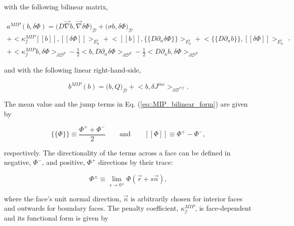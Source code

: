 \documentclass[preprint,10pt]{elsarticle}
\begin{document}
\noindent with the following bilinear matrix,

\begin{equation}
\label{eq::MIP_bilinear_form}
\begin{aligned}
a^{MIP}(b, \delta \Phi)  = \Big(  D \vec{\nabla} b , \vec{\nabla} \delta \Phi  \Big)_{\mathcal{D}} + \Big(  \sigma b , \delta \Phi  \Big)_{\mathcal{D}}    \\
+  \Big< \kappa_f^{MIP} [\![   b ]\!] , [\![  \delta \Phi ]\!]\Big>_{E_h^i} + \Big<  [\![  b ]\!] , \{\!\{  D \partial_n \delta \Phi \}\!\}\Big>_{E_h^i}  + \Big< \{\!\{  D \partial_n b \}\!\} , [\![ \delta \Phi ]\!]\Big>_{E_h^i} \\
+ \Big< \kappa_f^{MIP}  b , \delta  \Phi \Big>_{\partial \mathcal{D}^d} - \frac{1}{2} \Big<  b ,  D \partial_n \delta \Phi \Big>_{\partial \mathcal{D}^d} - \frac{1}{2} \Big<   D \partial_n b , \delta \Phi \Big>_{\partial \mathcal{D}^d}  
\end{aligned} ,
\end{equation}

\noindent and with the following linear right-hand-side,

\begin{equation}
\label{eq::MIP_linear_form}
b^{MIP} (b) = \Big(  b, Q  \Big)_{\mathcal{D}}  + \Big< b, \delta  J^{inc}  \Big>_{\partial \mathcal{D}^{ref}} .
\end{equation}

\noindent  The mean value and the jump terms in Eq. (\ref{eq::MIP_bilinear_form}) are given by

\begin{equation}
\label{eq::solution_mean_and_jump}
\{\!\{  \Phi \}\!\} \equiv \frac{\Phi^+ + \Phi^-}{2} \qquad \text{and} \qquad [\![   \Phi ]\!] \equiv \Phi^+ - \Phi^- ,
\end{equation}

\noindent respectively. The directionality of the terms across a face can be defined in negative, $\Phi^-$, and positive, $\Phi^+$ directions by their trace:

\begin{equation}
\label{eq::solution_trace}
\Phi^{\pm} \equiv \lim_{s \rightarrow 0^{\pm}} \Phi (\vec{r} + s \vec{n}),
\end{equation}

\noindent where the face's unit normal direction, $\vec{n}$ is arbitrarily chosen for interior faces and outwards for boundary faces. The penalty coefficient, $\kappa_f^{MIP}$, is face-dependent and its functional form is given by
\end{document}
